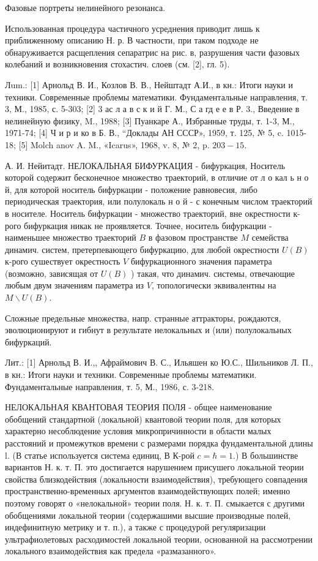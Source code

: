 \documentclass[10pt]{article}
\begin{document}
Фазовые портреты нелинейного резонанса.



Использованная процедура частичного усреднения приводит лишь к приближенному описанию Н. р. В частности, при таком подходе не обнаруживается расщепления сепаратрис на рис. в, разрушения части фазовых колебаний и возникновения стохастич. слоев (см. [2], гл. 5).



Лum.: [1] Арнольд В. И., Козлов В. В., Нейштадт А.И., в кн.: Итоги науки и техники. Современные проблемы математики. Фундаментальные направления, т. 3, М., 1985, с. 5-303; [2] 3 ас л а в с к и й Г. М., С а гд е е в Р. 3., Введение в нелинейную физику, M., 1988; [3] Пуанкаре А., Избранные труды, т. 1-3, М., 1971-74; [4] Ч и р и ко в Б. В., “Доклады АН СССР», 1959, т. 125, № 5, c. 1015-18; [5] Molch anov A. M., «Icarus», 1968, v. 8, № 2, p. $203-15$.



А. И. Нейитадт. НЕЛОКАЛЬНАЯ БИФУРКАЦИЯ - бифуркация, Носитель которой содержит бесконечное множество траекторий, в отличие от л о кал ь н о й, для которой носитель бифуркации - положение равновесия, либо периодическая траектория, или полулокаль н о й - с конечным числом траекторий в носителе. Носитель бифуркации - множество траекторий, вне окрестности к-рого бифуркация никак не проявляется. Точнее, носитель бифуркации - наименьшее множество траекторий $B$ в фазовом пространстве $M$ семейства динамич. систем, претерпевающего бифуркацию, для любой окрестности $U(B)$ к-рого сушествует окрестность $V$ бифуркационного значения параметра (возможно, зависящая от $U(B)$ ) такая, что динамич. системы, отвечающие любым двум значениям параметра из $V$, топологически эквивалентны на $M \backslash U(B)$.



Сложные предельные множества, напр. странные аттракторы, рождаются, эволюционируют и гибнут в результате нелокальных и (или) полулокальных бифуркаций.



Лит.: [1] Арнольд В. И.,, Афраймович В. С., Ильяшен ко Ю.С., Шильников Л. П., в кн.: Итоги науки и техники. Современные проблемы математики. Фундаментальные направления, т. 5, М., 1986, с. 3-218.



НЕЛОКАЛЬНАЯ КВАНТОВАЯ ТЕОРИЯ ПОЛЯ - общее наименование обобщений стандартной (локальной) квантовой теории поля, для которых характерно несоблюдение условия микропричинности в области малых расстояний и промежутков времени с размерами порядка фундаментальной длины l. (В статье используется система единиц, В К-рой $c=\hbar=1$.) В большинстве вариантов Н. к. т. П. это достигается нарушением присушего локальной теории свойства близкодействия (локальности взаимодействия), требующего совпадения пространственно-временных аргументов взаимодействующих полей; именно поэтому говорят о «нелокальной» теории поля. Н. к. т. П. смыкается с другими обобщениями локальной теории (содержашими высшие производные полей, индефинитную метрику и т. п.), а также с процедурой регуляризации ультрафиолетовых расходимостей локальной теории, основанной на рассмотрении локального взаимодействия как предела «размазанного».
\end{document}
